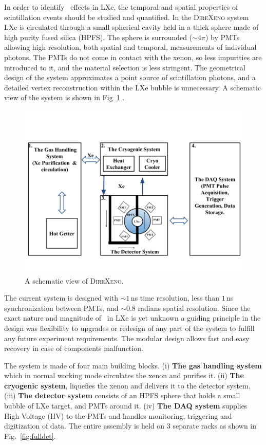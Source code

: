 In order to identify \superradiance\ effects in LXe, the temporal and spatial properties of scintillation events should be studied and quantified. In the \textsc{DireXeno} system LXe is circulated through a small spherical cavity held in a thick sphere made of high purity fused silica (HPFS). The sphere is surrounded ($\sim4\pi$) by PMTs allowing high resolution, both spatial and temporal, measurements of individual photons. The PMTs do not come in contact with the xenon, so less impurities are introduced to it, and the material selection is less stringent. The geometrical design of the system approximates a point  source of scintillation photons, and a detailed vertex reconstruction within the LXe bubble is unnecessary. A schematic view of the system is shown in Fig~\ref{fig:detSch} . 

\begin{figure}[h]
\centerline{\includegraphics[width=0.8\linewidth]{fig/DetSch.png}}
\caption{A schematic view of \textsc{DireXeno}.}
\label{fig:detSch}
\end{figure}


The current system is designed with $\sim1$\,ns time resolution, less than $1$\,ns synchronization between PMTs, and $\sim0.8$ radians spatial resolution. Since the exact nature and magnitude of \superradiance\ in LXe is yet unknown a guiding principle in the design was flexibility to upgrades or redesign of any part of the system to fulfill any future experiment requirements. The modular design allows fast and easy recovery in case of components malfunction.

The system is made of four main building blocks. (i) \textbf{The gas handling system} which in normal working mode circulates the xenon and purifies it. (ii) \textbf{The cryogenic system}, liquefies the xenon and 
delivers it to the detector system. (iii) \textbf{The detector system} consists of an HPFS sphere that 
holds a small bubble of LXe target, and PMTs around it. (iv) \textbf{The DAQ system} supplies High Voltage (HV) 
to the PMTs and handles monitoring, triggering and digitization of data. The entire assembly is held on 3 separate racks as shown in Fig.~\ref{fig:fulldet}.



